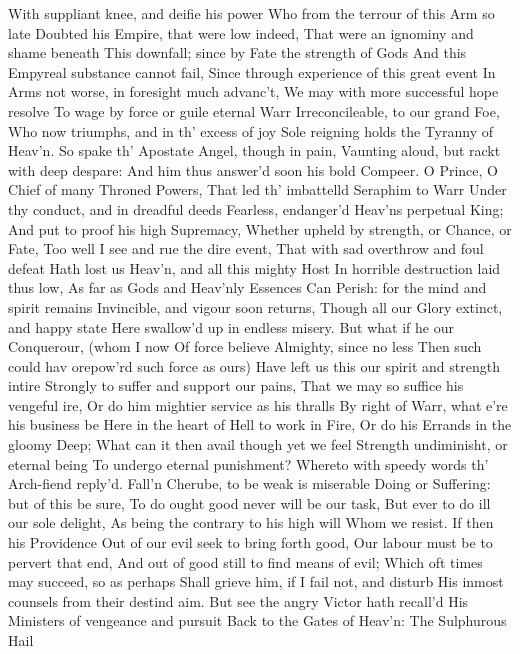 \documentclass[11pt]{book}
\begin{document}
With suppliant knee, and deifie his power 
Who from the terrour of this Arm so late 
Doubted his Empire, that were low indeed, 
That were an ignominy and shame beneath 
This downfall; since by Fate the strength of Gods 
And this Empyreal substance cannot fail, 
Since through experience of this great event 
In Arms not worse, in foresight much advanc't, 
We may with more successful hope resolve 
To wage by force or guile eternal Warr 
Irreconcileable, to our grand Foe, 
Who now triumphs, and in th' excess of joy 
Sole reigning holds the Tyranny of Heav'n. 
\quad So spake th' Apostate Angel, though in pain, 
Vaunting aloud, but rackt with deep despare: 
And him thus answer'd soon his bold Compeer. 
\quad O Prince, O Chief of many Throned Powers, 
That led th' imbattelld Seraphim to Warr 
Under thy conduct, and in dreadful deeds 
Fearless, endanger'd Heav'ns perpetual King; 
And put to proof his high Supremacy, 
Whether upheld by strength, or Chance, or Fate, 
Too well I see and rue the dire event, 
That with sad overthrow and foul defeat 
Hath lost us Heav'n, and all this mighty Host 
In horrible destruction laid thus low, 
As far as Gods and Heav'nly Essences 
Can Perish: for the mind and spirit remains 
Invincible, and vigour soon returns, 
Though all our Glory extinct, and happy state 
Here swallow'd up in endless misery. 
But what if he our Conquerour, (whom I now 
Of force believe Almighty, since no less 
Then such could hav orepow'rd such force as ours) 
Have left us this our spirit and strength intire 
Strongly to suffer and support our pains, 
That we may so suffice his vengeful ire, 
Or do him mightier service as his thralls 
By right of Warr, what e're his business be 
Here in the heart of Hell to work in Fire, 
Or do his Errands in the gloomy Deep; 
What can it then avail though yet we feel 
Strength undiminisht, or eternal being 
To undergo eternal punishment? 
Whereto with speedy words th' Arch-fiend reply'd. 
\quad Fall'n Cherube, to be weak is miserable 
Doing or Suffering: but of this be sure, 
To do ought good never will be our task, 
But ever to do ill our sole delight, 
As being the contrary to his high will 
Whom we resist.  If then his Providence 
Out of our evil seek to bring forth good, 
Our labour must be to pervert that end, 
And out of good still to find means of evil; 
Which oft times may succeed, so as perhaps 
Shall grieve him, if I fail not, and disturb 
His inmost counsels from their destind aim. 
But see the angry Victor hath recall'd 
His Ministers of vengeance and pursuit 
Back to the Gates of Heav'n: The Sulphurous Hail 
\end{document}
